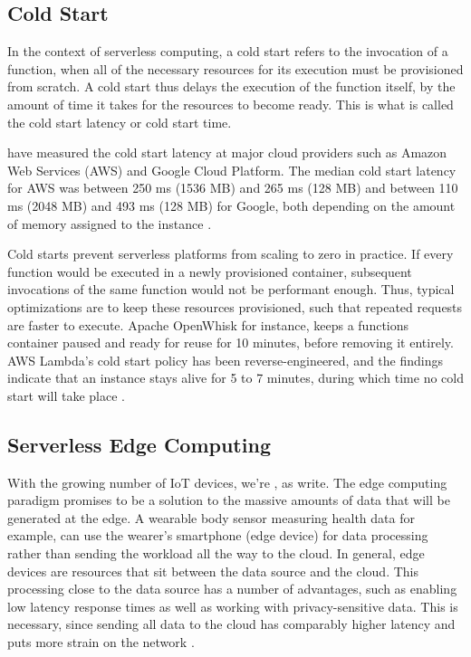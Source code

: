 \subsection{Cold Start}

In the context of serverless computing, a cold start refers to the invocation of a function, when all of the necessary resources for its execution must be provisioned from scratch. A cold start thus delays the execution of the function itself, by the amount of time it takes for the resources to become ready. This is what is called the cold start latency or cold start time.

\citeauthor{Wang2018} have measured the cold start latency at major cloud providers such as Amazon Web Services (AWS) and Google Cloud Platform. The median cold start latency for AWS was between 250 ms (1536 MB) and 265 ms (128 MB) and between 110 ms (2048 MB) and 493 ms (128 MB) for Google, both depending on the amount of memory assigned to the instance \cite{Wang2018}.

Cold starts prevent serverless platforms from scaling to zero in practice. If every function would be executed in a newly provisioned container, subsequent invocations of the same function would not be performant enough. Thus, typical optimizations are to keep these resources provisioned, such that repeated requests are faster to execute. Apache OpenWhisk for instance, keeps a functions container paused and ready for reuse for 10 minutes, before removing it entirely. AWS Lambda's cold start policy has been reverse-engineered, and the findings indicate that an instance stays alive for 5 to 7 minutes, during which time no cold start will take place \cite{ShilCold2021}.

\subsection{Serverless Edge Computing}

With the growing number of IoT devices, we're , as \citeauthor{Shi2016} write. The edge computing paradigm promises to be a solution to the massive amounts of data that will be generated at the edge. A wearable body sensor measuring health data for example, can use the wearer's smartphone (edge device) for data processing rather than sending the workload all the way to the cloud. In general, edge devices are resources that sit between the data source and the cloud. This processing close to the data source has a number of advantages, such as enabling low latency response times as well as working with privacy-sensitive data. This is necessary, since sending all data to the cloud has comparably higher latency and puts more strain on the network \cite{Shi2016}.

